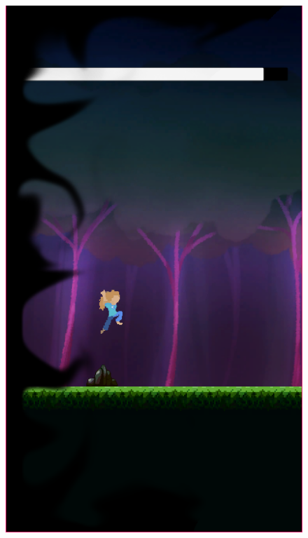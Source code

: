 \documentclass[12pt]{article}
\begin{document}
\begin{figure}[h]
\begin{minipage}{.15\textwidth}
        \includegraphics[width=\textwidth]{imgs/screenshot6.png}
    \end{minipage}
    \begin{minipage}{.15\textwidth}

\end{minipage}
\end{figure}
\end{document}
